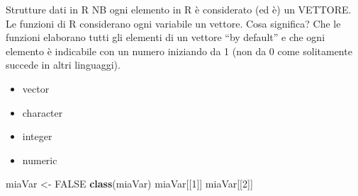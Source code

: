 \documentclass[
  ignorenonframetext,
]{beamer}
\newenvironment{Shaded}{\begin{snugshade}}{\end{snugshade}}
\newcommand{\ConstantTok}[1]{\textcolor[rgb]{0.56,0.35,0.01}{#1}}
\newcommand{\DecValTok}[1]{\textcolor[rgb]{0.00,0.00,0.81}{#1}}
\newcommand{\FunctionTok}[1]{\textcolor[rgb]{0.13,0.29,0.53}{\textbf{#1}}}
\newcommand{\NormalTok}[1]{#1}
\newcommand{\OtherTok}[1]{\textcolor[rgb]{0.56,0.35,0.01}{#1}}
\providecommand{\tightlist}{%
  \setlength{\itemsep}{0pt}\setlength{\parskip}{0pt}}
\begin{document}
\begin{frame}[fragile]{Strutture dati in R}
\protect\hypertarget{strutture-dati-in-r}{}
NB ogni elemento in R è considerato (ed è) un VETTORE. Le funzioni di R
considerano ogni variabile un vettore. Cosa significa? Che le funzioni
elaborano tutti gli elementi di un vettore ``by default'' e che ogni
elemento è indicabile con un numero iniziando da 1 (non da 0 come
solitamente succede in altri linguaggi).

\begin{itemize}
\tightlist
\item
  vector
\item
  character
\item
  integer
\item
  numeric
\end{itemize}

\begin{Shaded}
\begin{Highlighting}[]
\NormalTok{miaVar }\OtherTok{\textless{}{-}} \ConstantTok{FALSE}
\FunctionTok{class}\NormalTok{(miaVar)}
\NormalTok{miaVar[[}\DecValTok{1}\NormalTok{]]}
\NormalTok{miaVar[[}\DecValTok{2}\NormalTok{]]}
\end{Highlighting}
\end{Shaded}
\end{frame}
\end{document}
